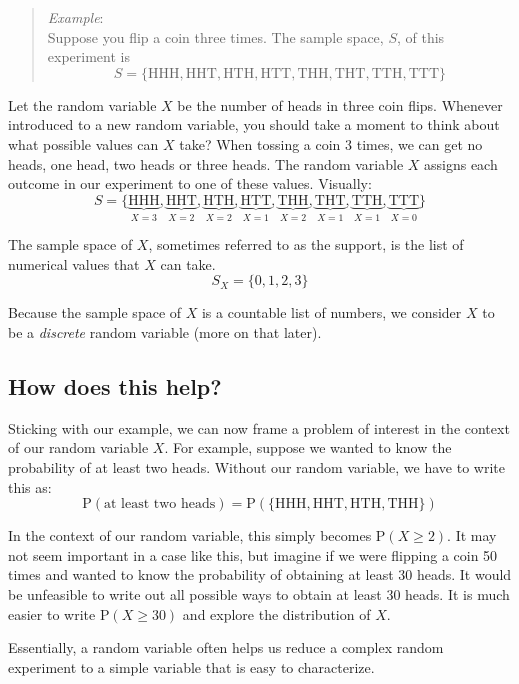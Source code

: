\documentclass[
  letterpaper,
  DIV=11,
  numbers=noendperiod]{scrreprt}
\begin{document}
\begin{quote}
\emph{Example}:\\
Suppose you flip a coin three times. The sample space, \(S\), of this
experiment is \[
S=\{\mbox{HHH}, \mbox{HHT}, \mbox{HTH}, \mbox{HTT}, \mbox{THH}, \mbox{THT}, \mbox{TTH}, \mbox{TTT}\}
\]
\end{quote}

Let the random variable \(X\) be the number of heads in three coin
flips. Whenever introduced to a new random variable, you should take a
moment to think about what possible values can \(X\) take? When tossing
a coin 3 times, we can get no heads, one head, two heads or three heads.
The random variable \(X\) assigns each outcome in our experiment to one
of these values. Visually: \[
S=\{\underbrace{\mbox{HHH}}_{X=3}, \underbrace{\mbox{HHT}}_{X=2}, \underbrace{\mbox{HTH}}_{X=2}, \underbrace{\mbox{HTT}}_{X=1}, \underbrace{\mbox{THH}}_{X=2}, \underbrace{\mbox{THT}}_{X=1}, \underbrace{\mbox{TTH}}_{X=1}, \underbrace{\mbox{TTT}}_{X=0}\}
\]

The sample space of \(X\), sometimes referred to as the support, is the
list of numerical values that \(X\) can take. \[
S_X=\{0,1,2,3\}
\]

Because the sample space of \(X\) is a countable list of numbers, we
consider \(X\) to be a \emph{discrete} random variable (more on that
later).

\subsection{How does this help?}\label{how-does-this-help}

Sticking with our example, we can now frame a problem of interest in the
context of our random variable \(X\). For example, suppose we wanted to
know the probability of at least two heads. Without our random variable,
we have to write this as: \[
\mbox{P}(\mbox{at least two heads})= \mbox{P}(\{\mbox{HHH},\mbox{HHT},\mbox{HTH},\mbox{THH}\})
\]

In the context of our random variable, this simply becomes
\(\mbox{P}(X\geq 2)\). It may not seem important in a case like this,
but imagine if we were flipping a coin 50 times and wanted to know the
probability of obtaining at least 30 heads. It would be unfeasible to
write out all possible ways to obtain at least 30 heads. It is much
easier to write \(\mbox{P}(X\geq 30)\) and explore the distribution of
\(X\).

Essentially, a random variable often helps us reduce a complex random
experiment to a simple variable that is easy to characterize.
\end{document}
